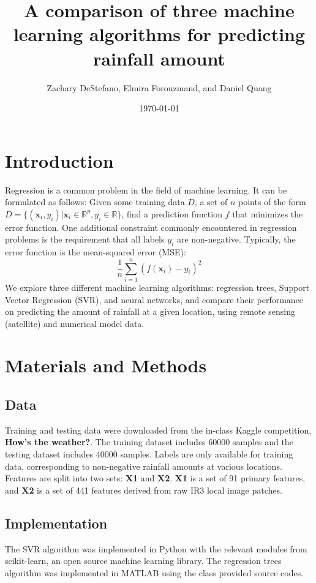\documentclass[12pt] {article}
\begin{document}
\title{A comparison of three machine learning algorithms for predicting rainfall amount}
\author{Zachary DeStefano, Elmira Forouzmand, and Daniel Quang}
\date \today
\maketitle
\thispagestyle{empty}
\bigskip
\pagebreak
\setcounter{page}{1}
\section{Introduction}
Regression is a common problem in the field of machine learning. It can be formulated as follows: Given some training data $D$, a set of $n$ points of the form $D=\{(\mathbf{x}_i,y_i) | \mathbf{x}_i \in \mathbb{R}^p, y_i \in \mathbb{R} \}$, find a prediction function $f$ that minimizes the error function. One additional constraint commonly encountered in regression problems is the requirement that all labels $y_i$ are non-negative. Typically, the error function is the mean-squared error (MSE): 
$$\frac{1}{n}\sum_{i=1}^n\left(f(\mathbf{x}_i)-y_i\right)^2$$
We explore three different machine learning algorithms: regression trees, Support Vector Regression (SVR), and neural networks, and compare their performance on predicting the amount of rainfall at a given location, using remote sensing (satellite) and numerical model data. 
\section{Materials and Methods}
\subsection{Data}
Training and testing data were downloaded from the in-class Kaggle competition, \textbf{How's the weather?}. The training dataset includes 60000 samples and the testing dataset includes 40000 samples. Labels are only available for training data, corresponding to non-negative rainfall amounts at various locations. Features are split into two sets: \textbf{X1} and \textbf{X2}. \textbf{X1} is a set of 91 primary features, and \textbf{X2} is a set of 441 features derived from raw IR3 local image patches.   

\subsection{Implementation}
The SVR algorithm was implemented in Python with the relevant modules from scikit-learn, an open source machine learning library. The regression trees algorithm was implemented in MATLAB using the class provided source codes.
\end{document}
